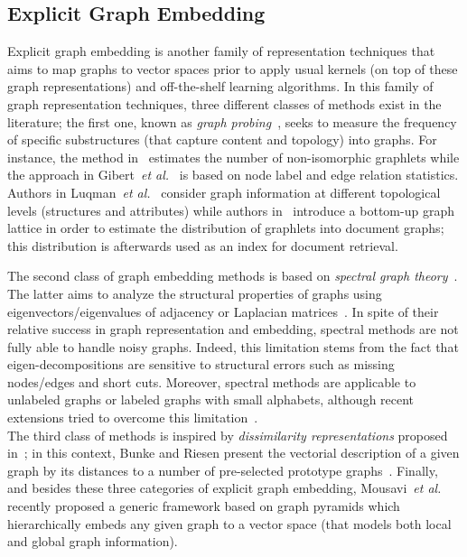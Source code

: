 \documentclass[journal]{IEEEtran}
\theoremstyle{definition}
\newcommand{\etal}{\textit{et al.}}
\begin{document}
\subsection{Explicit Graph Embedding}
Explicit graph embedding is another family of representation techniques that aims to map graphs to vector spaces prior to apply usual kernels (on top of these graph representations) and off-the-shelf learning algorithms. In this family of graph representation techniques, three different classes of methods exist in the literature; the first one, known as \emph{graph probing}~\cite{Luqman2013}, seeks to measure the frequency of specific substructures (that capture content and topology) into graphs. For instance, the method in~\cite{Shervashidze2009a} estimates the number of non-isomorphic graphlets while the approach in Gibert~\etal~\cite{Gibert2012} is based on node label and edge relation statistics. Authors in Luqman~\etal~\cite{Luqman2013} consider graph information at different topological levels (structures and attributes) while authors in~\cite{Saund2013} introduce a bottom-up graph lattice in order to estimate the distribution of graphlets into document graphs; this distribution is afterwards used as an index for document retrieval.

The second class of graph embedding methods is based on \emph{spectral graph theory}~\cite{Caelli2004,Wilson2005,RoblesKelly2007,Jouili2010}. The latter aims to analyze the structural properties of graphs using eigenvectors/eigenvalues of adjacency or Laplacian matrices~\cite{Wilson2005}. In spite of their relative success in graph representation and embedding, spectral methods are not fully able to handle noisy graphs. Indeed, this limitation stems from the fact that eigen-decompositions are sensitive to structural errors such as missing nodes/edges and short cuts. Moreover, spectral methods are applicable to unlabeled graphs or labeled graphs with small alphabets, although recent extensions tried to overcome this limitation~\cite{Lee2009}. \\
\indent The third class of methods is inspired by \emph{dissimilarity representations} proposed in~\cite{Pekalska2005}; in this context, Bunke and Riesen present the vectorial description of a given graph by its distances to a number of pre-selected prototype graphs~\cite{Riesen2007a,Riesen2009a,Bunke2010,Borzeshi2013}. Finally, and besides these three categories of explicit graph embedding, Mousavi~\etal~\cite{Mousavi2017} recently proposed a generic framework based on graph pyramids which hierarchically embeds any given graph to a vector space (that models both local and global graph information).
 
\end{document}
